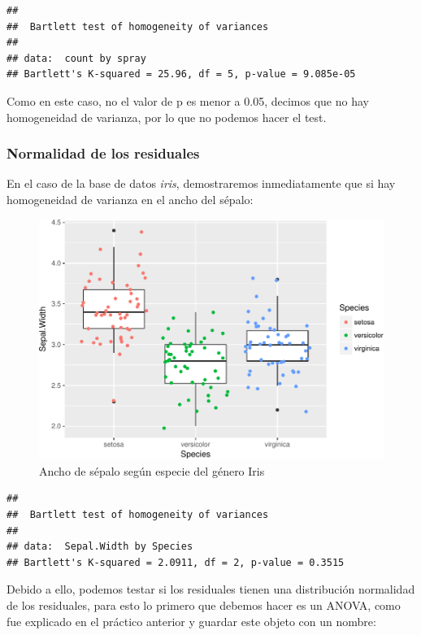 \documentclass[]{article}
\begin{document}
\begin{verbatim}
## 
##  Bartlett test of homogeneity of variances
## 
## data:  count by spray
## Bartlett's K-squared = 25.96, df = 5, p-value = 9.085e-05
\end{verbatim}

Como en este caso, no el valor de p es menor a 0.05, decimos que no hay
homogeneidad de varianza, por lo que no podemos hacer el test.

\subsubsection{Normalidad de los
residuales}\label{normalidad-de-los-residuales}

En el caso de la base de datos \emph{iris}, demostraremos inmediatamente
que si hay homogeneidad de varianza en el ancho del sépalo:

\begin{figure}
\centering
\includegraphics{Guia3_files/figure-latex/unnamed-chunk-3-1.pdf}
\caption{Ancho de sépalo según especie del género Iris}
\end{figure}

\begin{verbatim}
## 
##  Bartlett test of homogeneity of variances
## 
## data:  Sepal.Width by Species
## Bartlett's K-squared = 2.0911, df = 2, p-value = 0.3515
\end{verbatim}

Debido a ello, podemos testar si los residuales tienen una distribución
normalidad de los residuales, para esto lo primero que debemos hacer es
un ANOVA, como fue explicado en el práctico anterior y guardar este
objeto con un nombre:
\end{document}
